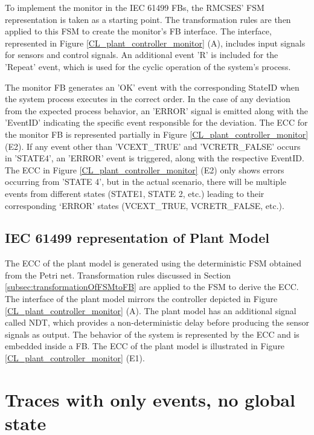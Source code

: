\documentclass{ieeeojies}
\begin{document}
To implement the monitor in the IEC 61499 FBs, the RMCSES' FSM representation is taken as a starting point. The transformation rules are then applied to this FSM to create the monitor's FB interface. The interface, represented in Figure \ref{CL_plant_controller_monitor} (A), includes input signals for sensors and control signals. An additional event 'R' is included for the 'Repeat' event, which is used for the cyclic operation of the system's process.


The monitor FB generates an 'OK' event with the corresponding StateID when the system process executes in the correct order. In the case of any deviation from the expected process behavior, an 'ERROR' signal is emitted along with the 'EventID' indicating the specific event responsible for the deviation. The ECC for the monitor FB is represented partially in Figure \ref{CL_plant_controller_monitor} (E2). If any event other than 'VCEXT\_TRUE' and 'VCRETR\_FALSE' occurs in 'STATE4', an 'ERROR' event is triggered, along with the respective EventID. The ECC in Figure \ref{CL_plant_controller_monitor} (E2) only shows errors occurring from 'STATE 4', but in the actual scenario, there will be multiple events from different states (STATE1, STATE 2, etc.) leading to their corresponding ‘ERROR’ states (VCEXT\_TRUE, VCRETR\_FALSE, etc.).


\subsection{IEC 61499 representation of Plant Model}



The ECC of the plant model is generated using the deterministic FSM obtained from the Petri net. Transformation rules discussed in Section \ref{subsec:transformationOfFSMtoFB} are applied to the FSM to derive the ECC. The interface of the plant model mirrors the controller depicted in  Figure \ref{CL_plant_controller_monitor} (A). The plant model has an additional signal called NDT, which provides a non-deterministic delay before producing the sensor signals as output. The behavior of the system is represented by the ECC and is embedded inside a FB. The ECC of the plant model is illustrated in Figure  \ref{CL_plant_controller_monitor} (E1).


\section{Traces with only events, no global state}
\end{document}
